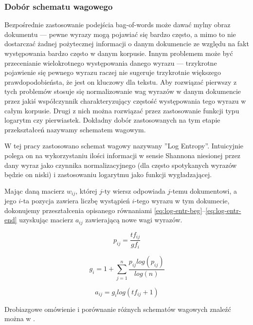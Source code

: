\documentclass[11pt,a4paper]{article}
\begin{document}
\subsubsection{Dobór schematu wagowego}
\label{weighting}

Bezpośrednie zastosowanie podejścia bag-of-words może dawać mylny obraz
dokumentu --- pewne wyrazy mogą pojawiać się bardzo często, a mimo to nie
dostarczać żadnej pożytecznej informacji o danym dokumencie ze względu na fakt
występowania bardzo często w danym korpusie. Innym problemem może być
przecenianie wielokrotnego występowania danego wyrazu --- trzykrotne pojawienie
się pewnego wyrazu raczej nie sugeruje trzykrotnie większego prawdopodobieństa,
że jest on kluczowy dla tekstu. Aby rozwiązać pierwszy z tych problemów stosuje
się normalizowanie wag wyrazów w danym dokumencie przez jakiś współczynnik
charakteryzujący częstość występowania tego wyrazu w całym korpusie. Drugi z
nich można rozwiązać przez zastosowanie funkcji typu logarytm czy pierwiastek.
Dokładny dobór zastosowanych na tym etapie przekształceń nazywamy schematem
wagowym.

W tej pracy zastosowano schemat wagowy nazywany ''Log Entropy''.  Intuicyjnie
polega on na wykorzystaniu ilości informacji w sensie Shannona niesionej przez
dany wyraz jako czynnika normalizacyjnego (dla często spotykanych wyrazów
będzie on niski) i zastosowaniu logarytmu jako funkcji wygładzającej.

Mając daną macierz $w_{ij}$, której $j$-ty wiersz odpowiada $j$-temu
dokumentowi, a jego $i$-ta pozycja zawiera liczbę wystąpień $i$-tego wyrazu w
tym dokumecie, dokonujemy przeształcenia opisanego równaniami
\ref{eq:log-entr-beg}--\ref{eq:log-entr-end} uzyskując macierz $a_{ij}$
zawierającą nowe wagi wyrazów.

\begin{equation}
  \label{eq:log-entr-beg}
  p_{ij} = \frac{tf_{ij}}{gf_i}
\end{equation}

\begin{equation}
  g_i = 1 + \sum_{j=1}^n \frac{p_{ij} log(p_{ij})}{log(n)}
\end{equation}

\begin{equation}
  \label{eq:log-entr-end}
  a_{ij} = g_i log(tf_{ij} + 1)
\end{equation}

Drobiazgowe omówienie i porównanie różnych schematów wagowych znaleźć moż\-na w
\cite{figiel}.
\end{document}
